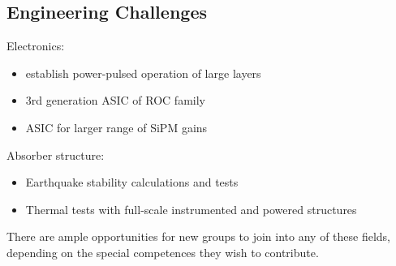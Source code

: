 \subsection{Engineering Challenges}

Electronics:
\begin{itemize}
\item establish power-pulsed operation of large layers
\item 3rd generation ASIC of ROC family
\item ASIC for larger range of SiPM gains
\end{itemize}

Absorber structure:
\begin{itemize}
\item Earthquake stability calculations and tests
\item Thermal tests with full-scale instrumented and powered structures
\end{itemize}

There are ample opportunities for new groups to join into any of these fields, depending on the special competences they wish to contribute.
